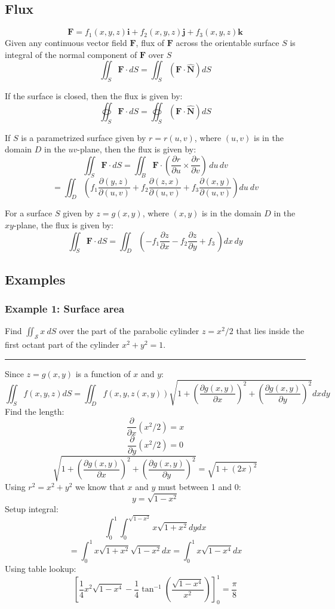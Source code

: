 \subsection{Flux}
$$\mathbf{F}=f_1(x,y,z)\mathbf{i}+f_2(x,y,z)\mathbf{j}+f_3(x,y,z)\mathbf{k}$$
Given any continuous vector field $\mathbf{F}$, flux of $\mathbf{F}$ across the orientable surface $S$ is integral of the normal component of $\mathbf{F}$ over $S$
$$\iint_S\mathbf{F}\cdot dS=\iint_{S}(\mathbf{F}\cdot\mathbf{\widehat{N}})dS$$

If the surface is closed, then the flux is given by:
$$\oiint_S\mathbf{F}\cdot dS=\oiint_{S}(\mathbf{F}\cdot\mathbf{\widehat{N}})dS$$

If $S$ is a parametrized surface given by $r=r(u,v)$, where $(u,v)$ is in the domain $D$ in the $uv$-plane, then the flux is given by:
$$\iint_{S}\mathbf{F}\cdot d S=\iint_{B}\mathbf{F}\cdot\left({\frac{\partial r}{\partial u}}\times{\frac{\partial r}{\partial v}}\right)\,d u\,d v$$
$$=\iint_D\left(f_1\frac{\partial (y,z)}{\partial (u,v)}+f_2\frac{\partial (z,x)}{\partial (u,v)}+f_3\frac{\partial (x,y)}{\partial (u,v)}\right)du\ dv$$

For a surface $S$ given by $z=g(x,y)$, where $(x,y)$ is in the domain $D$ in the $xy$-plane, the flux is given by:
$$\iint_{S}\mathbf{F}\cdot d S=\iint_D\left(-f_{1}\frac{\partial z}{\partial x}-f_{2}\frac{\partial z}{\partial y}+f_{3}\,\right)d x\,d y$$
\subsection{Examples}
\subsubsection{Example 1: Surface area}
Find $\iint_{\mathcal{S}}x\ dS$ over the part of the parabolic cylinder $z=x^2/2$ that lies inside the first octant 
part of the cylinder $x^2+y^2=1$.

\rule{\textwidth}{0.5pt}

Since $z=g(x,y)$ is a function of $x$ and $y$:
$$\iint_{S}f(x,y,z)d S=\iint_{D}f(x,y,z(x,y))\sqrt{1+\left(\frac{ \partial g(x,y) }{ \partial x } \right)^{2}+\left(\frac{ \partial g(x,y) }{ \partial y } \right)^{2}}d x d y$$ 
Find the length:
$$\frac{\partial}{\partial x}(x^2/2)=x$$
$$\frac{\partial}{\partial y}(x^2/2)=0$$
$$\sqrt{1+\left(\frac{ \partial g(x,y) }{ \partial x } \right)^{2}+\left(\frac{ \partial g(x,y) }{ \partial y } \right)^{2}}=\sqrt{1+(2x)^2}$$
Using $r^2=x^2+y^2$ we know that $x$ and $y$ must between 1 and 0:
$$y=\sqrt{1-x^2}$$
Setup integral:
$$\int_0^1\int_0^{\sqrt{1-x^2}}x\sqrt{1+x^2}dydx$$
$$=\int_0^1x\sqrt{1+x^2}\sqrt{1-x^2}dx=\int_0^1x\sqrt{1-x^4}dx$$
Using table lookup:
$$\left[\frac{1}{4} x^2 \sqrt{1-x^4}-\frac{1}{4} \tan ^{-1}\left(\frac{\sqrt{1-x^4}}{x^2}\right)\right]_0^1=\frac{\pi}{8}$$


